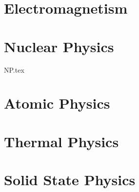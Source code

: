 \documentclass[a4paper]{article}
\numberwithin{equation}{section}
\begin{document}
\section{Electromagnetism}

\section{Nuclear Physics}
{NP.tex}

\section{Atomic Physics}

\section{Thermal Physics}

\section{Solid State Physics}
\end{document}
